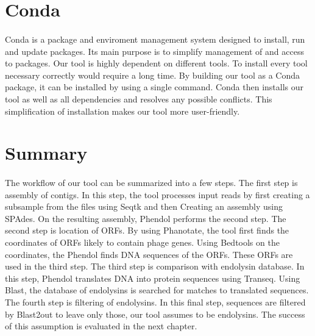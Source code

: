 \section{Conda}
\paragraph*{}
Conda is a package and enviroment management system designed to install, run and update packages. Its main purpose is to simplify management of and access to packages. Our tool is highly dependent on different tools. To install every tool necessary correctly would require a long time. By building our tool as a Conda package, it can be installed by using a single command. Conda then installs our tool as well as all dependencies and resolves any possible conflicts. This simplification of installation makes our tool more user-friendly.

\section{Summary}
\paragraph*{}
The workflow of our tool can be summarized into a few steps. The first step is assembly of contigs. In this step, the tool processes input reads by first creating a subsample from the files using Seqtk and then Creating an assembly using SPAdes. On the resulting assembly, Phendol performs the second step. The second step is location of ORFs. By using Phanotate, the tool first finds the coordinates of ORFs likely to contain phage genes. Using Bedtools on the coordinates, the Phendol finds DNA sequences of the ORFs. These ORFs are used in the third step. The third step is comparison with endolysin database. In this step, Phendol translates DNA into protein sequences using Transeq. Using Blast, the database of endolysins is searched for matches to translated sequences. The fourth step is filtering of endolysins. In this final step, sequences are filtered by Blast2out to leave only those, our tool assumes to be endolysins. The success of this assumption is evaluated in the next chapter.